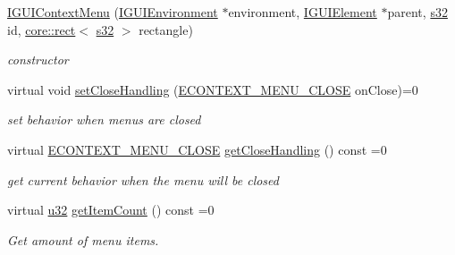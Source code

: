 \begin{DoxyCompactItemize}
\hyperlink{classirr_1_1gui_1_1IGUIContextMenu_ab7201b420431830aaaf8f9a0a831c859}{I\+G\+U\+I\+Context\+Menu} (\hyperlink{classirr_1_1gui_1_1IGUIEnvironment}{I\+G\+U\+I\+Environment} $\ast$environment, \hyperlink{classirr_1_1gui_1_1IGUIElement}{I\+G\+U\+I\+Element} $\ast$parent, \hyperlink{namespaceirr_ac66849b7a6ed16e30ebede579f9b47c6}{s32} id, \hyperlink{classirr_1_1core_1_1rect}{core\+::rect}$<$ \hyperlink{namespaceirr_ac66849b7a6ed16e30ebede579f9b47c6}{s32} $>$ rectangle)
\begin{DoxyCompactList}\small\item\em constructor \end{DoxyCompactList}\item 
\mbox{\label{classirr_1_1gui_1_1IGUIContextMenu_ae58a13dc73dffc7d30a907b76111a36d}} 
virtual void \hyperlink{classirr_1_1gui_1_1IGUIContextMenu_ae58a13dc73dffc7d30a907b76111a36d}{set\+Close\+Handling} (\hyperlink{namespaceirr_1_1gui_a0868ffd1ff3d3fc1e2db2fcd118e320d}{E\+C\+O\+N\+T\+E\+X\+T\+\_\+\+M\+E\+N\+U\+\_\+\+C\+L\+O\+SE} on\+Close)=0
\begin{DoxyCompactList}\small\item\em set behavior when menus are closed \end{DoxyCompactList}\item 
\mbox{\label{classirr_1_1gui_1_1IGUIContextMenu_ac9f46b106a1732ab474f3b38bf564edb}} 
virtual \hyperlink{namespaceirr_1_1gui_a0868ffd1ff3d3fc1e2db2fcd118e320d}{E\+C\+O\+N\+T\+E\+X\+T\+\_\+\+M\+E\+N\+U\+\_\+\+C\+L\+O\+SE} \hyperlink{classirr_1_1gui_1_1IGUIContextMenu_ac9f46b106a1732ab474f3b38bf564edb}{get\+Close\+Handling} () const =0
\begin{DoxyCompactList}\small\item\em get current behavior when the menu will be closed \end{DoxyCompactList}\item 
\mbox{\label{classirr_1_1gui_1_1IGUIContextMenu_a3e65b423c67002b64d6271072b19a829}} 
virtual \hyperlink{namespaceirr_a0416a53257075833e7002efd0a18e804}{u32} \hyperlink{classirr_1_1gui_1_1IGUIContextMenu_a3e65b423c67002b64d6271072b19a829}{get\+Item\+Count} () const =0
\begin{DoxyCompactList}\small\item\em Get amount of menu items. \end{DoxyCompactList}\item 

\end{DoxyCompactItemize}
